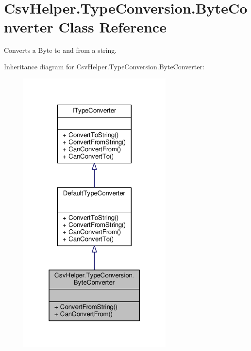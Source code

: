 \hypertarget{a00026}{\section{Csv\-Helper.\-Type\-Conversion.\-Byte\-Converter Class Reference}
\label{a00026}
}


Converts a Byte to and from a string.  




Inheritance diagram for Csv\-Helper.\-Type\-Conversion.\-Byte\-Converter\-:
\nopagebreak
\begin{figure}[H]
\begin{center}
\leavevmode
\includegraphics[width=220pt]{de/df8/a00440}
\end{center}
\end{figure}


